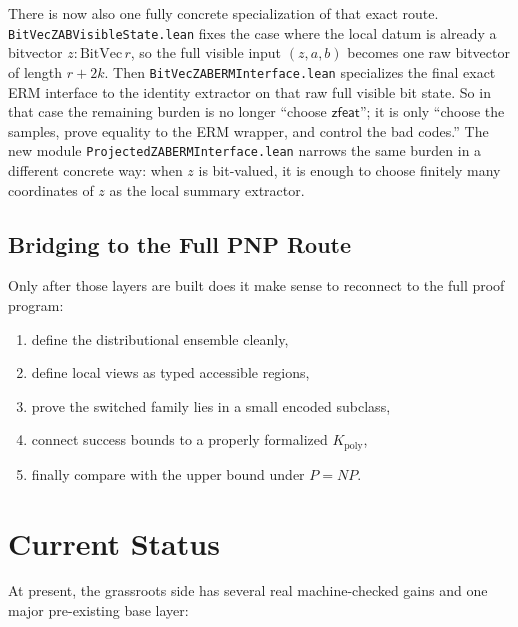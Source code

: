 \documentclass[11pt]{article}
\theoremstyle{remark}
\begin{document}
There is now also one fully concrete specialization of that exact route.
\texttt{BitVecZABVisibleState.lean} fixes the case where the local datum is
already a bitvector \(z : \mathrm{BitVec}\, r\), so the full visible input
\((z,a,b)\) becomes one raw bitvector of length \(r+2k\).  Then
\texttt{BitVecZABERMInterface.lean} specializes the final exact ERM interface
to the identity extractor on that raw full visible bit state.  So in that
case the remaining burden is no longer “choose \(\mathsf{zfeat}\)”; it is only
“choose the samples, prove equality to the ERM wrapper, and control the bad
codes.”  The new module \texttt{ProjectedZABERMInterface.lean} narrows the same
burden in a different concrete way: when \(z\) is bit-valued, it is enough to
choose finitely many coordinates of \(z\) as the local summary extractor.

\subsection{Bridging to the Full PNP Route}

Only after those layers are built does it make sense to reconnect to the full
proof program:
\begin{enumerate}[leftmargin=1.5em]
  \item define the distributional ensemble cleanly,
  \item define local views as typed accessible regions,
  \item prove the switched family lies in a small encoded subclass,
  \item connect success bounds to a properly formalized \(K_{\mathrm{poly}}\),
  \item finally compare with the upper bound under \(P=NP\).
\end{enumerate}

\section{Current Status}

At present, the grassroots side has several real machine-checked gains and one
major pre-existing base layer:
\end{document}
